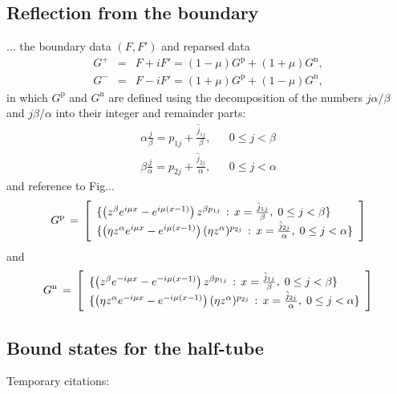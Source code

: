 \documentclass[12pt]{article}
\begin{document}
\subsection{Reflection from the boundary}\label{sec:reflection} %





\bigskip
... the boundary data $(F,F')$ and reparsed data
%
\begin{eqnarray}
  G^+ &=& F + iF' = (1-\mu) G^\text{p} + (1+\mu) G^\text{n}, \\
  G^- &=& F - iF' = (1+\mu) G^\text{p} + (1-\mu) G^\text{n},
\end{eqnarray}
%
in which $G^\text{p}$ and $G^\text{n}$ are defined using the decomposition of the numbers $j\alpha/\beta$ and $j\beta/\alpha$ into their integer and remainder parts:
%
\begin{eqnarray}
  \alpha\frac{j}{\beta} = p_{1j} + \frac{\hat j_{1j}}{\beta}, && 0\leq j<\beta \\
  \beta\frac{j}{\alpha} = p_{2j} + \frac{\hat j_{2j}}{\alpha}, && 0\leq j<\alpha  
\end{eqnarray}
%
and reference to Fig...
%
\begin{equation}
  G^\text{p} \,=\,
\renewcommand{\arraystretch}{1.4}
\left[
  \begin{array}{l}
    \{ \textstyle \left( z^\beta e^{i\mu x} - e^{i\mu(x-1)} \right) z^{\beta p_{1j}} \,:\, x=\frac{\hat j_{1j}}{\beta},\; 0\leq j<\beta \} \\
    \{ \textstyle \left( \eta z^\alpha e^{i\mu x} - e^{i\mu(x-1)} \right) (\eta z^\alpha)^{p_{2j}} \,:\, x=\frac{\hat j_{2j}}{\alpha},\; 0\leq j<\alpha \}    
  \end{array}
\right]
\end{equation}
%
and
%
\begin{equation}
  G^\text{n} \,=\,
\renewcommand{\arraystretch}{1.4}
\left[
  \begin{array}{l}
    \{ \textstyle \left( z^\beta e^{-i\mu x} - e^{-i\mu(x-1)} \right) z^{\beta p_{1j}} \,:\, x=\frac{\hat j_{1j}}{\beta},\; 0\leq j<\beta \} \\
    \{ \textstyle \left( \eta z^\alpha e^{-i\mu x} - e^{-i\mu(x-1)} \right) (\eta z^\alpha)^{p_{2j}} \,:\, x=\frac{\hat j_{2j}}{\alpha},\; 0\leq j<\alpha \}    
  \end{array}
\right]
\end{equation}
%




\subsection{Bound states for the half-tube}\label{sec:boundstates} %







\bigskip

Temporary citations:
\cite{BerkolaikoKuchment2013,KuchmentPost2007,Shipman2014}




\end{document}

